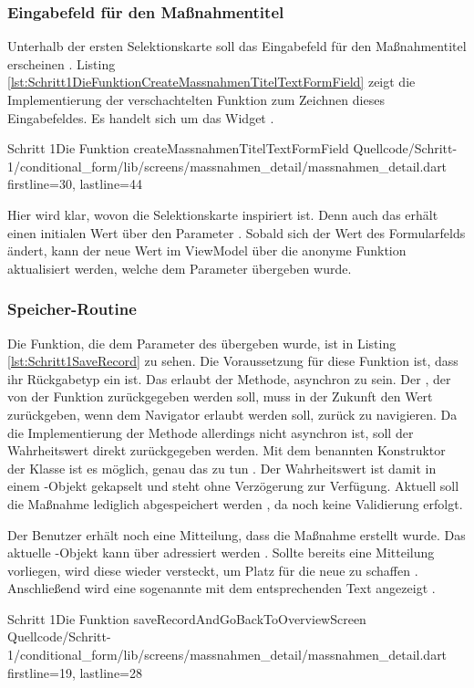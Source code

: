 \subsubsection{Eingabefeld für den Maßnahmentitel}


Unterhalb der ersten Selektionskarte soll das Eingabefeld für den Maßnahmentitel erscheinen .
Listing \ref{lst:Schritt1DieFunktionCreateMassnahmenTitelTextFormField} zeigt die Implementierung der verschachtelten Funktion zum Zeichnen dieses Eingabefeldes.
 Es handelt sich um das Widget  .


\begin{alexlisting}{Schritt 1}{Die Funktion createMassnahmenTitelTextFormField}
  {Quellcode/Schritt-1/conditional_form/lib/screens/massnahmen_detail/massnahmen_detail.dart}
  {firstline=30, lastline=44}
  \label{lst:Schritt1DieFunktionCreateMassnahmenTitelTextFormField}
\end{alexlisting}

Hier wird klar, wovon die Selektionskarte inspiriert ist.
Denn auch das  erhält einen initialen Wert über den Parameter .
Sobald sich der Wert des Formularfelds ändert, kann der neue Wert im ViewModel über die anonyme Funktion aktualisiert werden, welche dem Parameter  übergeben wurde.


\subsubsection{Speicher-Routine}


Die Funktion, die dem Parameter  des  übergeben wurde, ist in Listing \ref{lst:Schritt1SaveRecord} zu sehen.
Die Voraussetzung für diese Funktion ist, dass ihr Rückgabetyp ein  ist.
Das erlaubt der Methode, asynchron zu sein.
Der , der von der Funktion zurückgegeben werden soll, muss in der Zukunft den Wert  zurückgeben, wenn dem Navigator erlaubt  werden soll, zurück zu navigieren.
Da die Implementierung der Methode allerdings nicht asynchron ist, soll der Wahrheitswert direkt zurückgegeben werden.
Mit dem benannten Konstruktor  der Klasse  ist es möglich, genau das zu tun .
 Der Wahrheitswert ist damit in einem -Objekt gekapselt und steht ohne Verzögerung zur Verfügung.
Aktuell soll die Maßnahme lediglich abgespeichert werden , da noch keine Validierung erfolgt.

Der Benutzer erhält noch eine Mitteilung, dass die Maßnahme erstellt wurde.
Das aktuelle -Objekt kann über  adressiert werden . Sollte bereits eine Mitteilung vorliegen, wird diese wieder versteckt, um Platz für die neue zu schaffen . Anschließend wird eine sogenannte  mit dem entsprechenden Text angezeigt .

\begin{alexlisting}{Schritt 1}{Die Funktion saveRecordAndGoBackToOverviewScreen}
  {Quellcode/Schritt-1/conditional_form/lib/screens/massnahmen_detail/massnahmen_detail.dart}
  {firstline=19, lastline=28}
  \label{lst:Schritt1SaveRecord}
\end{alexlisting}

\clearpage
